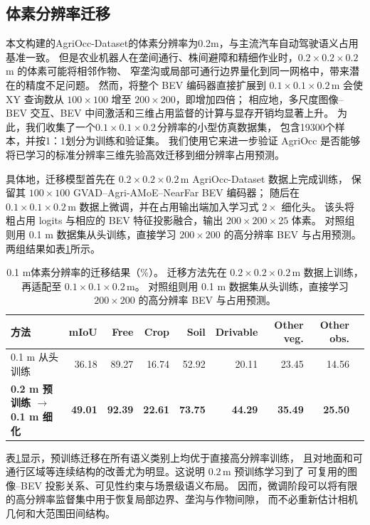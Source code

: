 \subsection{体素分辨率迁移}\label{sec:resolution_transfer}
本文构建的AgriOcc-Dataset的体素分辨率为0.2m，与主流汽车自动驾驶语义占用基准一致\cite{behley2019semantickitti,li2024sscbench}。
但是农业机器人在垄间通行、株间避障和精细作业时，$0.2\times0.2\times0.2\,$m 的体素可能将相邻作物、
窄垄沟或局部可通行边界量化到同一网格中，带来潜在的精度不足问题。
然而，将整个 BEV 编码器直接扩展到 $0.1\times0.1\times0.2\,$m 会使
 XY 查询数从 $100\times100$ 增至 $200\times200$，即增加四倍；
 相应地，多尺度图像--BEV 交互、BEV 中间激活和三维占用监督的计算与显存开销均显著上升。
 为此，我们收集了一个$0.1\times0.1\times0.2\,$分辨率的小型仿真数据集，
 包含19300个样本，并按1：1划分为训练和验证集。
 我们使用它来进一步验证 AgriOcc 是否能够将已学习的标准分辨率三维先验高效迁移到细分辨率占用预测。

具体地，迁移模型首先在 $0.2\times0.2\times0.2\,$m AgriOcc-Dataset 数据上完成训练，
保留其 $100\times100$ GVAD--Agri-AMoE--NearFar BEV 编码器；
随后在 $0.1\times0.1\times0.2\,$m 数据上微调，并在占用输出端加入学习式 $2\times$ 细化头。
该头将粗占用 logits 与相应的 BEV 特征投影融合，输出 $200\times200\times25$ 体素。
对照组则用 0.1 m 数据集从头训练，直接学习 $200\times200$ 的高分辨率 BEV 与占用预测。
两组结果如表\ref{tab:resolution_transfer}所示。

\begin{table}[htbp]
\centering
\caption{0.1 m体素分辨率的迁移结果（\%）。
迁移方法先在 $0.2\times0.2\times0.2\,$m 数据上训练，再适配至 $0.1\times0.1\times0.2\,$m。
对照组则用 0.1 m 数据集从头训练，直接学习 $200\times200$ 的高分辨率 BEV 与占用预测。}
\label{tab:resolution_transfer}
\fontsize{9}{11}\selectfont
\setlength{\tabcolsep}{2.4pt}
\begin{tabular}{lrrrrrrrr}
\toprule
方法 & mIoU & Free & Crop & Soil & Drivable & Other veg. & Other obs. \\
\midrule
0.1 m 从头训练 & 36.18 & 89.27 & 16.74 & 52.92 & 20.11 & 23.45 & 14.56 \\
\midrule
\textbf{0.2 m 预训练 $\rightarrow$ 0.1 m 细化} & \textbf{49.01} & \textbf{92.39} & \textbf{22.61} & \textbf{73.75} & \textbf{44.29} & \textbf{35.49} & \textbf{25.50} \\
\bottomrule
\end{tabular}
\end{table}

表\ref{tab:resolution_transfer}显示，预训练迁移在所有语义类别上均优于直接高分辨率训练，
且对地面和可通行区域等连续结构的改善尤为明显。这说明 $0.2\,$m 预训练学习到了
可复用的图像--BEV 投影关系、可见性约束与场景级语义布局。
因而，微调阶段可以将有限的高分辨率监督集中用于恢复局部边界、垄沟与作物间隙，
而不必重新估计相机几何和大范围田间结构。

